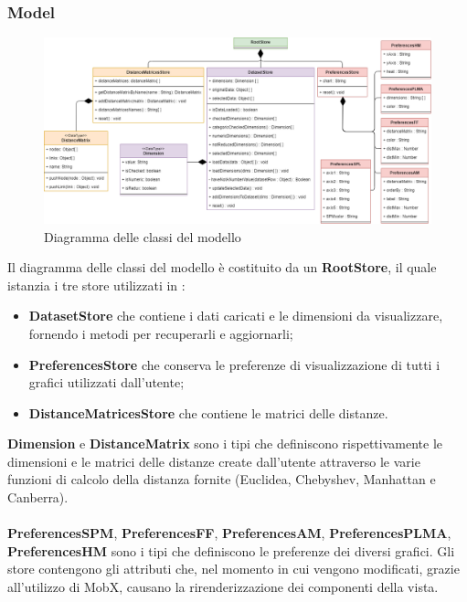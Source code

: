 \newpage
\subsubsection{Model}
\begin{figure}[hb]
\includegraphics[width=\linewidth]{Images/Allegato Tecnico-Store}
\centering
\caption{Diagramma delle classi del modello}
\end{figure}
Il diagramma delle classi del modello è costituito da un \textbf{RootStore}, il quale istanzia i tre store utilizzati in \NomeProgetto{}:
\begin{itemize}
	\item \textbf{DatasetStore} che contiene i dati caricati e le dimensioni da visualizzare, fornendo i metodi per recuperarli e aggiornarli;
	\item \textbf{PreferencesStore} che conserva le preferenze di visualizzazione di tutti i grafici utilizzati dall'utente; 
	\item \textbf{DistanceMatricesStore} che contiene le matrici delle distanze.
\end{itemize}
\textbf{Dimension} e \textbf{DistanceMatrix} sono i tipi che definiscono rispettivamente le dimensioni e le matrici delle distanze create dall'utente attraverso le varie funzioni di calcolo della distanza fornite (Euclidea, Chebyshev, Manhattan e Canberra). \\ \mbox{}\\
\textbf{PreferencesSPM}, \textbf{PreferencesFF}, \textbf{PreferencesAM}, \textbf{PreferencesPLMA}, \textbf{PreferencesHM} sono i tipi che definiscono le preferenze dei diversi grafici.
Gli store contengono gli attributi  che, nel momento in cui vengono modificati, grazie all'utilizzo di MobX, causano la rirenderizzazione dei componenti  della vista. 

